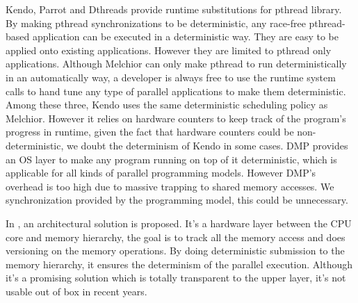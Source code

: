 Kendo\cite{olszewski2009kendo}, Parrot\cite{cui2013parrot} and Dthreads\cite{liu2011dthreads} provide runtime substitutions for pthread library. By making pthread synchronizations to be deterministic, any race-free pthread-based application can be executed in a deterministic way. They are easy to be applied onto existing applications. However they are limited to pthread only applications. Although Melchior can only make pthread to run deterministically in an automatically way, a developer is always free to use the runtime system calls to hand tune any type of parallel applications to make them deterministic. Among these three, Kendo uses the same deterministic scheduling policy as Melchior. However it relies on hardware counters to keep track of the program's progress in runtime, given the fact that hardware counters could be non-deterministic\cite{weaver2008can}, we doubt the determinism  of Kendo in some cases. DMP\cite{devietti2009dmp} provides an OS layer to make any program running on top of it deterministic, which is applicable for all kinds of parallel programming models. However DMP's overhead is too high due to massive trapping to shared memory accesses. We synchronization provided by the programming model, this could be unnecessary.

In \cite{segulja2012architectural}, an architectural solution is proposed. It's a hardware layer between the CPU core and memory hierarchy, the goal is to track all the memory access and does versioning on the memory operations. By doing deterministic submission to the memory hierarchy, it ensures the determinism of the parallel execution. Although it's a promising solution which is totally transparent to the upper layer, it's not usable out of box in recent years. 